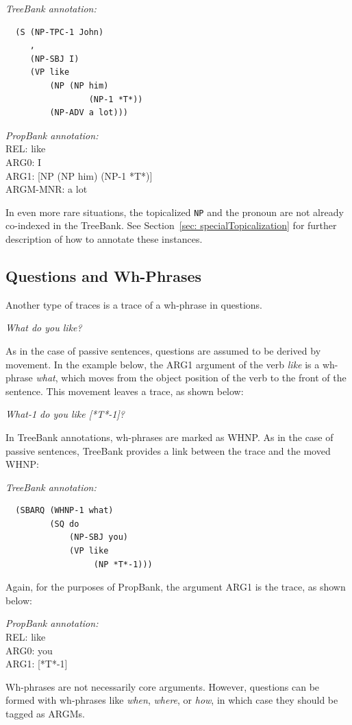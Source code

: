 \documentclass[11pt]{report}
\begin{document}
\textit{TreeBank annotation:}
\begin{verbatim}
  (S (NP-TPC-1 John)
     ,
     (NP-SBJ I)
     (VP like
         (NP (NP him)
	             (NP-1 *T*))
         (NP-ADV a lot)))
\end{verbatim}

\textit{PropBank annotation:}\\
REL:	like\\
ARG0:	I\\
ARG1:	[NP (NP him) (NP-1 *T*)]\\
ARGM-MNR:	a lot

In even more rare situations, the topicalized \texttt{NP} and the pronoun are not already co-indexed in the TreeBank. See Section~\ref{sec: specialTopicalization} for further description of how to annotate these instances. 

\subsection{Questions and Wh-Phrases}

Another type of traces is a trace of a wh-phrase in questions.

\textit{What do you like?}

As in the case of passive sentences, questions are assumed to be derived by movement.  In the example below, the ARG1 argument of the verb \textit{like} is a wh-phrase \textit{what}, which moves from the object position of the verb to the front of the sentence. This movement leaves a trace, as shown below:

\textit{What-1 do you like [*T*-1]?}

In TreeBank annotations, wh-phrases are marked as WHNP. As in the case of passive sentences, TreeBank provides a link between the trace and the moved WHNP:

\textit{TreeBank annotation:}
\begin{verbatim}
  (SBARQ (WHNP-1 what)
         (SQ do
             (NP-SBJ you)
             (VP like
                  (NP *T*-1)))
\end{verbatim}

Again, for the purposes of PropBank, the argument ARG1 is the trace, as shown below:

\textit{PropBank annotation:}\\
REL: like\\
ARG0: you\\
ARG1: [*T*-1]

Wh-phrases are not necessarily core arguments. However, questions can be formed with wh-phrases like \textit{when}, \textit{where}, or \textit{how}, in which case they should be tagged as ARGMs.  
\end{document}
